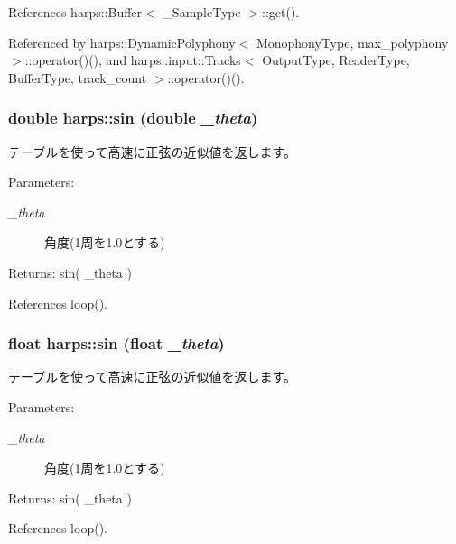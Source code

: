 References harps::Buffer$<$ \_\-SampleType $>$::get().

Referenced by harps::DynamicPolyphony$<$ MonophonyType, max\_\-polyphony $>$::operator()(), and harps::input::Tracks$<$ OutputType, ReaderType, BufferType, track\_\-count $>$::operator()().
\subsubsection[sin]{\setlength{\rightskip}{0pt plus 5cm}double harps::sin (double {\em \_\-theta})\hspace{0.3cm}{\tt  [inline]}}\label{namespaceharps_4286fc6aa658faf13aaa83d4d2402a4e}


テーブルを使って高速に正弦の近似値を返します。 \begin{Desc}
\item[Parameters:]
\begin{description}
\item[{\em \_\-theta}]角度(1周を1.0とする) \end{description}
\end{Desc}
\begin{Desc}
\item[Returns:]sin( \_\-theta ) \end{Desc}


References loop().
\subsubsection[sin]{\setlength{\rightskip}{0pt plus 5cm}float harps::sin (float {\em \_\-theta})\hspace{0.3cm}{\tt  [inline]}}\label{namespaceharps_14925ee15691035e1d0e8c9efbc73c0d}


テーブルを使って高速に正弦の近似値を返します。 \begin{Desc}
\item[Parameters:]
\begin{description}
\item[{\em \_\-theta}]角度(1周を1.0とする) \end{description}
\end{Desc}
\begin{Desc}
\item[Returns:]sin( \_\-theta ) \end{Desc}


References loop().
